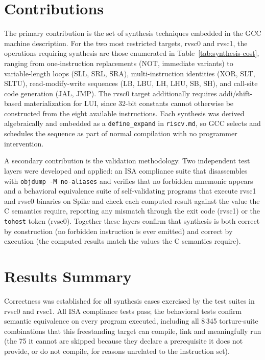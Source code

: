 \section{Contributions}

The primary contribution is the set of synthesis techniques embedded in the GCC machine description.
For the two most restricted targets, rvsc0 and rvsc1, the operations requiring synthesis are those
enumerated in Table~\ref{tab:synthesis-cost},
ranging from one-instruction replacements (NOT, immediate variants) to variable-length loops (SLL,
SRL, SRA), multi-instruction identities (XOR, SLT, SLTU), read-modify-write sequences (LB, LBU, LH,
LHU, SB, SH), and call-site code generation (JAL, JMP). The rvsc0 target additionally requires
addi/shift-based materialization for LUI, since 32-bit constants cannot otherwise be constructed from
the eight available instructions. Each synthesis was derived algebraically and embedded as a
\texttt{define\_expand} in \texttt{riscv.md}, so GCC selects and schedules the sequence as part of
normal compilation with no programmer intervention.

A secondary contribution is the validation methodology. Two independent test layers were developed
and applied: an ISA compliance suite that disassembles with \texttt{objdump -M no-aliases} and
verifies that no forbidden mnemonic appears
and a behavioral equivalence suite of self-validating programs that execute rvsc1 and rvsc0 binaries
on Spike and check each computed result against the value the C semantics require, reporting any
mismatch through the exit code (rvsc1) or the \texttt{tohost} token (rvsc0). Together these layers
confirm that synthesis is both correct by construction (no forbidden instruction is ever emitted) and
correct by execution (the computed results match the values the C semantics require).

\section{Results Summary}

Correctness was established for all synthesis cases exercised by the test suites in rvsc0 and rvsc1.
All ISA compliance tests pass; the behavioral tests confirm semantic equivalence on every program
executed, including all 8\,345 torture-suite combinations that this freestanding target can compile,
link and meaningfully run (the 75 it cannot are skipped because they declare a prerequisite it does
not provide, or do not compile, for reasons unrelated to the instruction set).

